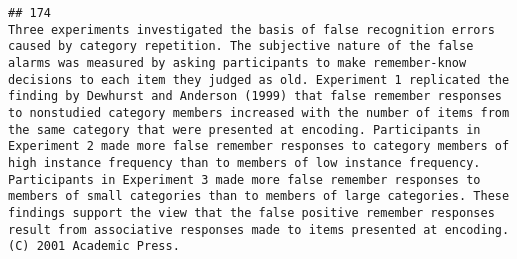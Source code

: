 \documentclass[
  english,
  man]{apa6}
\begin{document}
\begin{verbatim}
## 174                                                                                                                                                                                                                                                                                                                                                                                                                                                                                                                                                                                                                                                                                                                                                                                                                                                                                                                                                                                                                                                                                                                                                                                                                                                                                                                                                                                                                                                                                                                                                                                                                                                                                                                  Three experiments investigated the basis of false recognition errors caused by category repetition. The subjective nature of the false alarms was measured by asking participants to make remember-know decisions to each item they judged as old. Experiment 1 replicated the finding by Dewhurst and Anderson (1999) that false remember responses to nonstudied category members increased with the number of items from the same category that were presented at encoding. Participants in Experiment 2 made more false remember responses to category members of high instance frequency than to members of low instance frequency. Participants in Experiment 3 made more false remember responses to members of small categories than to members of large categories. These findings support the view that the false positive remember responses result from associative responses made to items presented at encoding. (C) 2001 Academic Press.

\end{verbatim}
\end{document}
